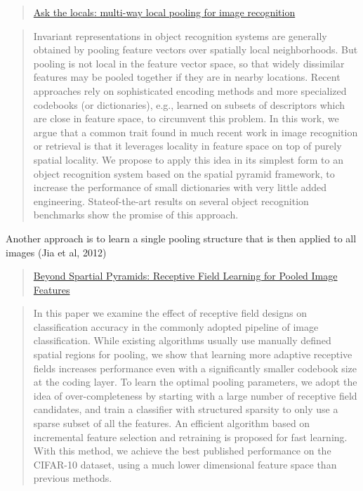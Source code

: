 \documentclass[onecolumn, letterpaper, 12pt]{report}
\begin{document}
\begin{quote}
\href{https://www.di.ens.fr/~fbach/boureau-iccv-11.pdf}{Ask the locals: multi-way local pooling for image recognition}
\end{quote}

\begin{quote}
  Invariant representations in object recognition systems are
  generally obtained by pooling feature vectors over spatially local
  neighborhoods. But pooling is not local in the feature vector space,
  so that widely dissimilar features may be pooled together if they
  are in nearby locations. Recent approaches rely on sophisticated
  encoding methods and more specialized codebooks (or dictionaries),
  e.g., learned on subsets of descriptors which are close in feature
  space, to circumvent this problem. In this work, we argue that a
  common trait found in much recent work in image recognition or
  retrieval is that it leverages locality in feature space on top of
  purely spatial locality. We propose to apply this idea in its
  simplest form to an object recognition system based on the spatial
  pyramid framework, to increase the performance of small dictionaries
  with very little added engineering. Stateof-the-art results on
  several object recognition benchmarks show the promise of this
  approach.
\end{quote}

Another approach is to learn a single pooling structure that is then applied to all images (Jia et al, 2012)

\begin{quote}
  \href{http://www.icsi.berkeley.edu/pubs/vision/beyondspatial12.pdf}{Beyond Spartial Pyramids: Receptive Field Learning for Pooled Image Features}
\end{quote}

\begin{quote}
  In this paper we examine the effect of receptive field designs on
  classification accuracy in the commonly adopted pipeline of image
  classification. While existing algorithms usually use manually
  defined spatial regions for pooling, we show that learning more
  adaptive receptive fields increases performance even with a
  significantly smaller codebook size at the coding layer. To learn
  the optimal pooling parameters, we adopt the idea of
  over-completeness by starting with a large number of receptive field
  candidates, and train a classifier with structured sparsity to only
  use a sparse subset of all the features. An efficient algorithm
  based on incremental feature selection and retraining is proposed
  for fast learning. With this method, we achieve the best published
  performance on the CIFAR-10 dataset, using a much lower dimensional
  feature space than previous methods.
\end{quote}
\end{document}
